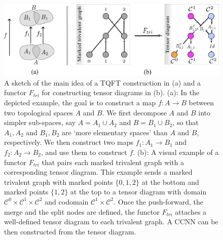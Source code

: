 \documentclass[
  12pt,
]{krantz}
\begin{document}
\begin{figure}

{\centering \includegraphics{figures/functor} 

}

\caption{A sketch of the main idea of a TQFT construction in (a) and a functor $F_{tri}$ for constructing tensor diagrams in (b). (a): In the depicted example, the goal is to construct a map $f\colon A\to B$ between two topological spaces $A$ and $B$. We first decompose $A$ and $B$ into simpler sub-spaces, say $A = A_1 \cup A_2$ and $B = B_1 \cup B_2$, so that ${A_1,A_2}$ and ${B_1,B_2}$ are `more elementary spaces' than $A$ and $B$, respectively. We then construct two maps $f_1 \colon A_1 \to B_1$ and $f_2 \colon A_2 \to B_2$, and use them to construct $f$. (b): A visual example of a functor $F_{tri}$ that pairs each marked trivalent graph with a corresponding tensor diagram. This example sends a marked trivalent graph with marked points $\{0,1,2\}$ at the bottom and marked points $\{1,2\}$ at the top to a tensor diagram with domain $\mathcal{C}^{0} \times \mathcal{C}^{1}\times \mathcal{C}^{2}$ and codomain $\mathcal{C}^{1}\times \mathcal{C}^{2}$. Once the push-forward, the merge and the split nodes are defined, the functor $F_{tri}$ attaches a well-defined tensor diagram to each trivalent graph. A CCNN can be then constructed from the tensor diagram.}\label{fig:functor}
\end{figure}
\end{document}
